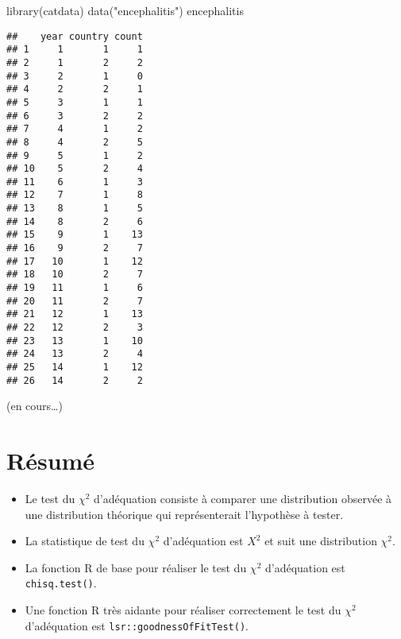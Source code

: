 \documentclass[
]{book}
\newenvironment{Shaded}{\begin{snugshade}}{\end{snugshade}}
\newcommand{\FunctionTok}[1]{\textcolor[rgb]{0.00,0.00,0.00}{#1}}
\newcommand{\NormalTok}[1]{#1}
\newcommand{\StringTok}[1]{\textcolor[rgb]{0.31,0.60,0.02}{#1}}
\providecommand{\tightlist}{%
  \setlength{\itemsep}{0pt}\setlength{\parskip}{0pt}}
\begin{document}
\begin{Shaded}
\begin{Highlighting}[]
\FunctionTok{library}\NormalTok{(catdata)}
\FunctionTok{data}\NormalTok{(}\StringTok{"encephalitis"}\NormalTok{)}
\NormalTok{encephalitis}
\end{Highlighting}
\end{Shaded}

\begin{verbatim}
##    year country count
## 1     1       1     1
## 2     1       2     2
## 3     2       1     0
## 4     2       2     1
## 5     3       1     1
## 6     3       2     2
## 7     4       1     2
## 8     4       2     5
## 9     5       1     2
## 10    5       2     4
## 11    6       1     3
## 12    7       1     8
## 13    8       1     5
## 14    8       2     6
## 15    9       1    13
## 16    9       2     7
## 17   10       1    12
## 18   10       2     7
## 19   11       1     6
## 20   11       2     7
## 21   12       1    13
## 22   12       2     3
## 23   13       1    10
## 24   13       2     4
## 25   14       1    12
## 26   14       2     2
\end{verbatim}

(en cours\ldots)

\hypertarget{ruxe9sumuxe9-4}{%
\section{Résumé}\label{ruxe9sumuxe9-4}}

\begin{itemize}
\tightlist
\item
  Le test du \(\chi^2\) d'adéquation consiste à comparer une distribution observée à une distribution théorique qui représenterait l'hypothèse à tester.
\item
  La statistique de test du \(\chi^2\) d'adéquation est \(X^2\) et suit une distribution \(\chi^2\).
\item
  La fonction R de base pour réaliser le test du \(\chi^2\) d'adéquation est \texttt{chisq.test()}.
\item
  Une fonction R très aidante pour réaliser correctement le test du \(\chi^2\) d'adéquation est \texttt{lsr::goodnessOfFitTest()}.
\end{itemize}

\printbibliography[title=Références, heading=bibintoc]
\end{document}
